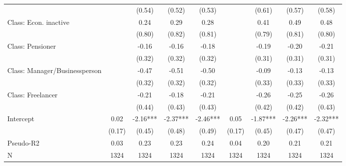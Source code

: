 \begin{tabular}[t]{lcccccccc}
 &  & (0.54) & (0.52) & (0.53) &  & (0.61) & (0.57) & (0.58)\\
Class: Econ. inactive &  & 0.24 & 0.29 & 0.28 &  & 0.41 & 0.49 & 0.48\\
 &  & (0.80) & (0.82) & (0.81) &  & (0.79) & (0.81) & (0.80)\\
Class: Pensioner &  & -0.16 & -0.16 & -0.18 &  & -0.19 & -0.20 & -0.21\\
 &  & (0.32) & (0.32) & (0.32) &  & (0.31) & (0.31) & (0.31)\\
Class: Manager/Businessperson &  & -0.47 & -0.51 & -0.50 &  & -0.09 & -0.13 & -0.13\\
 &  & (0.32) & (0.32) & (0.32) &  & (0.33) & (0.33) & (0.33)\\
Class: Freelancer &  & -0.21 & -0.18 & -0.21 &  & -0.26 & -0.25 & -0.26\\
 &  & (0.44) & (0.43) & (0.43) &  & (0.42) & (0.42) & (0.43)\\
Intercept & 0.02 & -2.16*** & -2.37*** & -2.46*** & 0.05 & -1.87*** & -2.26*** & -2.32***\\
 & (0.17) & (0.45) & (0.48) & (0.49) & (0.17) & (0.45) & (0.47) & (0.47)\\
\midrule
Pseudo-R2 & 0.03 & 0.23 & 0.23 & 0.24 & 0.04 & 0.20 & 0.21 & 0.21\\
N & 1324 & 1324 & 1324 & 1324 & 1324 & 1324 & 1324 & 1324\\
\bottomrule
\end{tabular}
